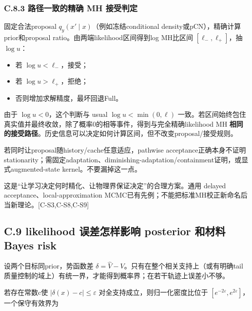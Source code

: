 \documentclass[
  11pt,
  a4paper,
]{article}
\providecommand{\tightlist}{%
  \setlength{\itemsep}{0pt}\setlength{\parskip}{0pt}}
\begin{document}
\hypertarget{c.8.3-ux8defux5f84ux4e00ux81f4ux7684ux7cbeux786e-mh-ux63a5ux53d7ux5224ux5b9a}{%
\subsubsection{C.8.3 路径一致的精确 MH
接受判定}\label{c.8.3-ux8defux5f84ux4e00ux81f4ux7684ux7cbeux786e-mh-ux63a5ux53d7ux5224ux5b9a}}

固定合法proposal \(q_y(x'\mid x)\)（例如冻结conditional
density或pCN），精确计算prior和proposal
ratio。由两端likelihood区间得到log MH比区间 \([\ell_-,\ell_+]\)，抽
\(\log u\)：

\begin{itemize}
\tightlist
\item
  若 \(\log u<\ell_-\)，接受；
\item
  若 \(\log u>\ell_+\)，拒绝；
\item
  否则增加求解精度，最坏回退Full。
\end{itemize}

由于 \(\log u<0\)，这个判断与 usual \(\log u<\min(0,\ell)\)
一致。若区间始终包住真实值并最终收敛，除了概率0的相等事件，得到与完全精确likelihood
MH
\textbf{相同的接受路径}。历史信息可以决定如何计算区间，但不改变proposal/接受规则。

若同时让proposal随history/cache任意适应，pathwise
acceptance正确本身不证明stationarity；需固定adaptation、diminishing-adaptation/containment证明，或显式augmented-state
kernel。不要漏掉这一点。

这是``让学习决定何时精化、让物理界保证决定''的合理方案。通用 delayed
acceptance、local-approximation
MCMC已有先例；不能把标准MH校正新命名后当新理论。{[}C-S3,C-S8,C-S9{]}

\hypertarget{c.9-likelihood-ux8befux5deeux600eux6837ux5f71ux54cd-posterior-ux548cux6750ux6599-bayes-risk}{%
\subsection{C.9 likelihood 误差怎样影响 posterior 和材料 Bayes
risk}\label{c.9-likelihood-ux8befux5deeux600eux6837ux5f71ux54cd-posterior-ux548cux6750ux6599-bayes-risk}}

设两个目标同prior，势函数差
\(\delta=\widehat V-V\)。只有在整个相关支持上（或有明确tail质量控制的域上）有统一界，才能得到概率界；在若干轨迹上误差小不够。

若存在常数c使 \(|\delta(x)-c|\le\varepsilon\)
对全支持成立，则归一化密度比位于
\([e^{-2\varepsilon},e^{2\varepsilon}]\)，一个保守有效界为
\end{document}
